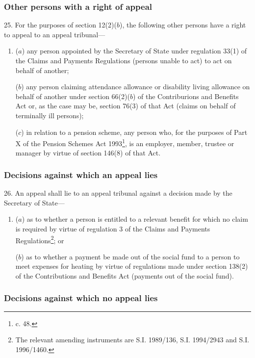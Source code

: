 \documentclass[12pt,a4paper]{article}
\begin{document}
\subsubsection[25. Other persons with a right of appeal]{Other persons with a right of appeal}

25.  For the purposes of section 12(2)($b$), the following other persons have a right to appeal to an appeal tribunal—
\begin{enumerate}\item[]
($a$) any person appointed by the Secretary of State under regulation 33(1) of the Claims and Payments Regulations (persons unable to act) to act on behalf of another;

($b$) any person claiming attendance allowance or disability living allowance on behalf of another under section 66(2)($b$) of the Contriburions and Benefits Act or, as the case may be, section 76(3) of that Act (claims on behalf of terminally ill persons);

($c$) in relation to a pension scheme, any person who, for the purposes of Part X of the Pension Schemes Act 1993\footnote{ c. 48.}, is an employer, member, trustee or manager by virtue of section 146(8) of that Act.
\end{enumerate}

\subsubsection[26. Decisions against which an appeal lies]{Decisions against which an appeal lies}

26.  An appeal shall lie to an appeal tribunal against a decision made by the Secretary of State—
\begin{enumerate}\item[]
($a$) as to whether a person is entitled to a relevant benefit for which no claim is required by virtue of regulation 3 of the Claims and Payments Regulations\footnote{\frenchspacing The relevant amending instruments are S.I. 1989/136, S.I. 1994/2943 and S.I. 1996/1460.}; or

($b$) as to whether a payment be made out of the social fund to a person to meet expenses for heating by virtue of regulations made under section 138(2) of the Contributions and Benefits Act (payments out of the social fund).
\end{enumerate}

\subsubsection[27. Decisions against which no appeal lies]{Decisions against which no appeal lies}
\end{document}
